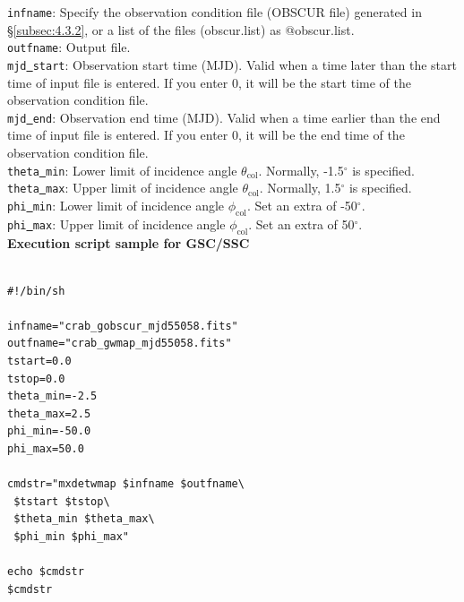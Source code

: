 \documentclass[10pt]{report}
\makeatletter
\renewcommand{\_}{\textscale{.5}{\textbf{\textunderscore}}}
\newcommand{\at}{\makeatletter @\makeatother}
\makeatother
\begin{document}
\noindent\texttt{infname}: Specify the observation condition file (OBSCUR file) generated in \S\ref{subsec:4.3.2}, or a list of the files (obscur.list) as \at obscur.list.\\

\noindent\texttt{outfname}: Output file. \\

\noindent\texttt{mjd\underline{ }start}: Observation start time (MJD). Valid when a time later than the start time of input file is entered. If you enter 0, it will be the start time of the observation condition file. \\

\noindent\texttt{mjd\underline{ }end}: Observation end time (MJD). Valid when a time earlier than the end time of input file is entered. If you enter 0, it will be the end time of the observation condition file. \\

\noindent\texttt{theta\underline{ }min}: Lower limit of incidence angle $\theta_{\text{col}}$. Normally, -1.5$^{\circ}$ is specified. \\

\noindent\texttt{theta\underline{ }max}: Upper limit of incidence angle $\theta_{\text{col}}$. Normally, 1.5$^{\circ}$ is specified. \\

\noindent\texttt{phi\underline{ }min}: Lower limit of incidence angle $\phi_{\text{col}}$. Set an extra of -50$^{\circ}$. \\

\noindent\texttt{phi\underline{ }max}: Upper limit of incidence angle $\phi_{\text{col}}$. Set an extra of 50$^{\circ}$. \\

\noindent\textbf{Execution script sample for GSC/SSC} \\

\begin{lstlisting}[frame=single]

#!/bin/sh

infname="crab_gobscur_mjd55058.fits"
outfname="crab_gwmap_mjd55058.fits"
tstart=0.0
tstop=0.0
theta_min=-2.5
theta_max=2.5
phi_min=-50.0
phi_max=50.0

cmdstr="mxdetwmap $infname $outfname\
 $tstart $tstop\
 $theta_min $theta_max\
 $phi_min $phi_max"
 
echo $cmdstr
$cmdstr

\end{lstlisting}
\end{document}
